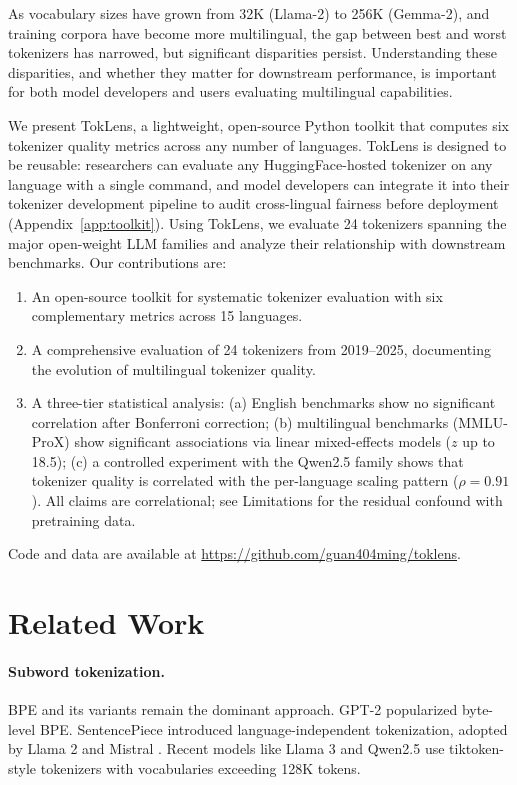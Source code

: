 \documentclass[11pt]{article}
\begin{document}
As vocabulary sizes have grown from 32K (Llama-2) to 256K (Gemma-2), and training corpora have become more multilingual, the gap between best and worst tokenizers has narrowed, but significant disparities persist. Understanding these disparities, and whether they matter for downstream performance, is important for both model developers and users evaluating multilingual capabilities.

We present TokLens, a lightweight, open-source Python toolkit that computes six tokenizer quality metrics across any number of languages. TokLens is designed to be reusable: researchers can evaluate any HuggingFace-hosted tokenizer on any language with a single command, and model developers can integrate it into their tokenizer development pipeline to audit cross-lingual fairness before deployment (Appendix~\ref{app:toolkit}). Using TokLens, we evaluate 24 tokenizers spanning the major open-weight LLM families and analyze their relationship with downstream benchmarks. Our contributions are:

\begin{enumerate}
    \item An open-source toolkit for systematic tokenizer evaluation with six complementary metrics across 15 languages.
    \item A comprehensive evaluation of 24 tokenizers from 2019--2025, documenting the evolution of multilingual tokenizer quality.
    \item A three-tier statistical analysis: (a) English benchmarks show no significant correlation after Bonferroni correction; (b) multilingual benchmarks (MMLU-ProX) show significant associations via linear mixed-effects models ($z$ up to 18.5); (c) a controlled experiment with the Qwen2.5 family shows that tokenizer quality is correlated with the per-language scaling pattern ($\rho = 0.91$). All claims are correlational; see Limitations for the residual confound with pretraining data.
\end{enumerate}

Code and data are available at \url{https://github.com/guan404ming/toklens}.

\section{Related Work}

\paragraph{Subword tokenization.} BPE \citep{sennrich-etal-2016-neural} and its variants remain the dominant approach. GPT-2 \citep{radford2019language} popularized byte-level BPE. SentencePiece \citep{kudo-richardson-2018-sentencepiece} introduced language-independent tokenization, adopted by Llama 2 and Mistral \citep{jiang2023mistral}. Recent models like Llama 3 \citep{dubey2024llama3} and Qwen2.5 \citep{yang2024qwen2} use tiktoken-style tokenizers with vocabularies exceeding 128K tokens.
\end{document}
